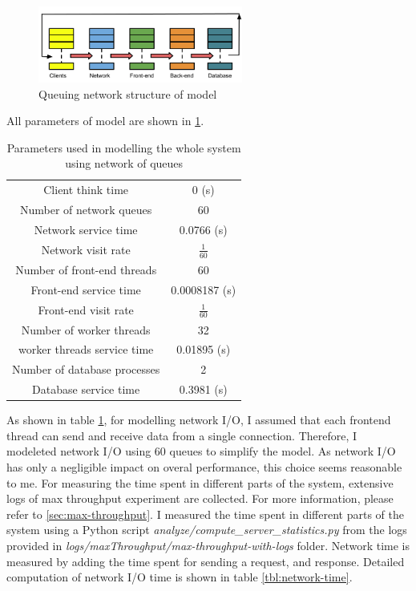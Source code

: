 \documentclass[11pt]{article}
\begin{document}
\begin{figure}[H]
  \includegraphics[width=0.6\textwidth,page=1]{figures/structure}
  \centering
    \caption{Queuing network structure of model}
  \label{fig:queue-structure}
\end{figure}

All parameters of model are shown in \cref{tbl:queue-model-1}.

\begin{table}[ht]
\centering
\begin{tabular}{|c|c|}
\hline
\rowcolor{myblue}
Client think time           & 0 (s) \\
\rowcolor{mypink}
Number of network queues    & 60   \\
\rowcolor{myblue}
Network service time        & 0.0766 (s) \\
\rowcolor{mypink}
Network visit rate          & $\frac{1}{60}$\\
\rowcolor{myblue}
Number of front-end threads & 60 \\
\rowcolor{mypink}
Front-end service time      & 0.0008187 (s)\\
\rowcolor{myblue}
Front-end visit rate        & $\frac{1}{60}$ \\ 
\rowcolor{mypink}
Number of worker threads    & 32 \\
\rowcolor{myblue}
worker threads service time & 0.01895 (s)\\
\rowcolor{mypink}
Number of database processes & 2 \\
\rowcolor{myblue}
Database service time        & 0.3981 (s)\\
\hline
\end{tabular}
\centering
\caption{Parameters used in modelling the whole system using network of queues}
\label{tbl:queue-model-1}
\end{table}

As shown in table \ref{tbl:queue-model-1}, for modelling network I/O, I assumed that 
each frontend thread can send and receive data from a single connection. Therefore, 
I modeleted network I/O using 60 queues to simplify the model. As network I/O
has only a negligible impact on overal performance, this choice seems reasonable to me.
For measuring the time spent in different parts of the system, extensive logs of max throughput
experiment are collected. For more information, please refer to \cref{sec:max-throughput}. 
I measured the time spent in different parts of the system using a Python script 
\emph{analyze/compute\_server\_statistics.py} from the logs provided in 
\emph{logs/maxThroughput/max-throughput-with-logs} folder. Network time is measured by adding the time spent for sending a request, and response. Detailed computation 
of network I/O time is shown in table \ref{tbl:network-time}. 
\end{document}
